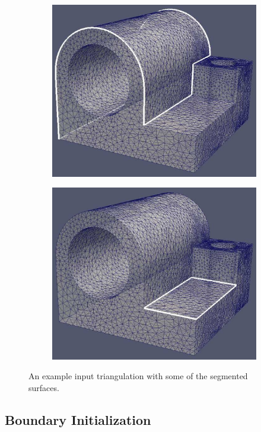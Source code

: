 \documentclass[conf]{new-aiaa}
\begin{document}
\begin{figure}[hbt!]
\begin{subfigure}{.5\textwidth}
\end{subfigure}
\begin{subfigure}{.5\textwidth}
  \centering
  \includegraphics[width=.8\linewidth]{surface-segmentation/surf5.eps}
  \caption{}
  \label{surf2}
\end{subfigure}%
\begin{subfigure}{.5\textwidth}
  \centering
  \includegraphics[width=.8\linewidth]{surface-segmentation/surf7.eps}
  \caption{}
  \label{surf3}
\end{subfigure}
\caption{An example input triangulation with some of the segmented surfaces.}
\label{surf-segment}
\end{figure}

\subsection{Boundary Initialization}
\end{document}
